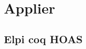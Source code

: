 \documentclass[thesis.tex]{subfiles}
\begin{document}
{{\section{Applier}\label{ssec:applier}

\subsection{Elpi coq HOAS}


}}
\end{document}
